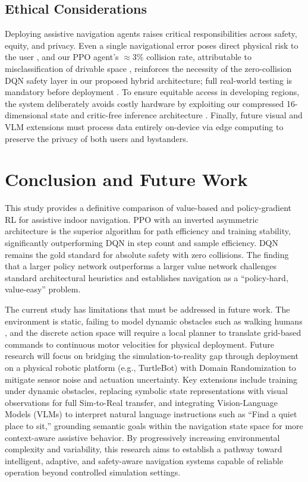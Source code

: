 \documentclass{article}
\begin{document}
\subsection{Ethical Considerations}

Deploying assistive navigation agents raises critical responsibilities across
safety, equity, and privacy. Even a single navigational error poses direct
physical risk to the user \cite{hsu2021,zhu2025}, and our PPO agent's
$\approx$3\% collision rate, attributable to misclassification of drivable
space \cite{mirzarazi2024}, reinforces the necessity of the zero-collision DQN
safety layer in our proposed hybrid architecture; full real-world testing is
mandatory before deployment \cite{anderson2020}. To ensure equitable access
in developing regions, the system deliberately avoids costly hardware by
exploiting our compressed 16-dimensional state and critic-free inference
architecture \cite{ikram2025,vijetha2023}. Finally, future visual and VLM
extensions must process data entirely on-device via edge computing to
preserve the privacy of both users and bystanders.

\section{Conclusion and Future Work}

This study provides a definitive comparison of value-based and policy-gradient RL
for assistive indoor navigation. PPO with an inverted asymmetric architecture is
the superior algorithm for path efficiency and training stability, significantly
outperforming DQN in step count and sample efficiency. DQN remains the gold
standard for absolute safety with zero collisions. The finding that a larger
policy network outperforms a larger value network challenges standard
architectural heuristics and establishes navigation as a ``policy-hard,
value-easy'' problem.

The current study has limitations that must be addressed in future work. The
environment is static, failing to model dynamic obstacles such as walking humans
\cite{ou2022}, and the discrete action space will require a local planner to
translate grid-based commands to continuous motor velocities for physical
deployment. Future research will focus on bridging the simulation-to-reality gap
through deployment on a physical robotic platform (e.g., TurtleBot) with Domain
Randomization to mitigate sensor noise and actuation uncertainty. Key extensions
include training under dynamic obstacles, replacing symbolic state representations
with visual observations for full Sim-to-Real transfer, and integrating
Vision-Language Models (VLMs) to interpret natural language instructions such as
``Find a quiet place to sit,'' grounding semantic goals within the navigation
state space for more context-aware assistive behavior. By progressively
increasing environmental complexity and variability, this research aims to
establish a pathway toward intelligent, adaptive, and safety-aware navigation
systems capable of reliable operation beyond controlled simulation settings.
\end{document}
